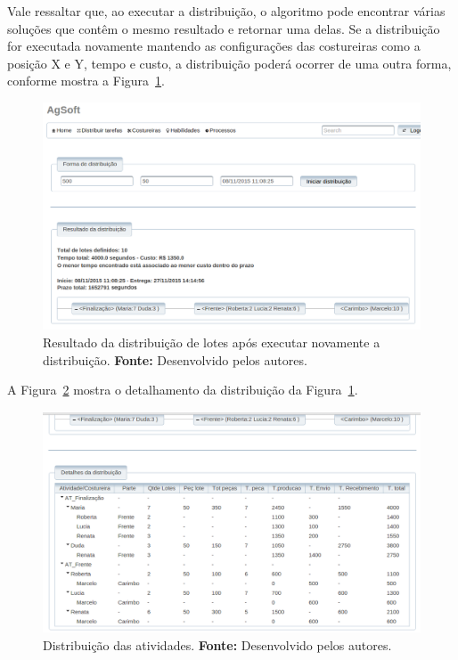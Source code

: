 \par Vale ressaltar que, ao executar a distribuição, o algoritmo pode
encontrar várias soluções que contêm o mesmo resultado e retornar uma delas. Se
a distribuição for executada novamente mantendo as configurações das costureiras
como a posição X e Y, tempo e custo, a distribuição poderá ocorrer de uma outra
forma, conforme mostra a Figura~\ref{fig:resultado2_teste5}.



\begin{figure}[h!]
	\centerline{\includegraphics[width=14.7cm]{./imagens/resultado2_teste5.png}}
	\caption[Resultado da distribuição de lotes após executar novamente a
	distribuição.]
	{Resultado da distribuição de lotes após executar novamente a
	distribuição. \textbf{Fonte:} Desenvolvido pelos autores.}
	\label{fig:resultado2_teste5}
\end{figure}


\par A Figura~\ref{fig:detalhamento2_teste5} mostra o detalhamento da
distribuição da Figura~\ref{fig:resultado2_teste5}.

\begin{figure}[h!]
	\centerline{\includegraphics[width=14.7cm]{./imagens/detalhamento2_teste5.png}}
	\caption[Distribuição das atividades.] 
	{Distribuição das atividades. \textbf{Fonte:} Desenvolvido pelos
	autores.}
	\label{fig:detalhamento2_teste5}
\end{figure}


